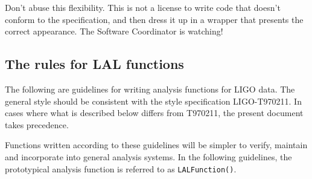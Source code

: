 \documentclass[]{ligodcc}
\begin{document}
Don't abuse this flexibility. This is not a license to write code that
doesn't conform to the specification, and then dress it up in a
wrapper that presents the correct appearance. The Software Coordinator
is watching!

\subsection{The rules for LAL functions}
The following are guidelines for writing analysis functions for LIGO
data. The general style should be consistent with the style
specification LIGO-T970211.  In cases where what is described below
differs from T970211, the present document takes precedence.

Functions written according to these guidelines will be simpler to
verify,  maintain and  incorporate into general analysis systems. In
the following guidelines, the prototypical analysis function is
referred to as {\tt LALFunction()}.
\end{document}
